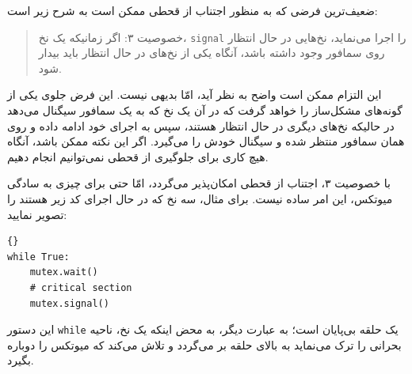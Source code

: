 \documentclass{book}
\begin{document}
    ضعیف‌ترین فرضی که به منظور اجتناب از قحطی ممکن است به شرح زیر است:

\begin{quote}
    خصوصیت ۳: اگر زمانیکه یک نخ، {\tt signal} را اجرا می‌نماید، نخ‌هایی در حال انتظار روی سمافور وجود داشته باشد،
    آنگاه یکی از نخ‌های در حال انتظار باید بیدار شود. 
\end{quote}

    این التزام ممکن است واضح به نظر آید، امّا بدیهی نیست. این فرض جلوی یکی از گونه‌های مشکل‌ساز را خواهد گرفت که در آن 
    یک نخ که به یک سمافور سیگنال می‌دهد در حالیکه نخ‌های دیگری در حال انتظار هستند، سپس به اجرای خود ادامه داده و روی همان سمافور منتظر شده و 
    سیگنال خودش را می‌گیرد. اگر این نکته ممکن باشد، آنگاه هیچ کاری برای جلوگیری از قحطی نمی‌توانیم انجام دهیم. 

    با خصوصیت ۳، اجتناب از قحطی امکان‌پذیر می‌گردد، امّا حتی برای چیزی به سادگی میوتکس، این امر ساده نیست. 
    برای مثال، سه نخ که در حال اجرای کد زیر هستند را تصویر نمایید:
    
\begin{latin}
\begin{lstlisting}[title=\rl{حلقه میوتکس}]{}
while True:
    mutex.wait()
    # critical section 
    mutex.signal()
\end{lstlisting}
\end{latin}

    این دستور {\tt while} یک حلقه بی‌پایان است؛ به عبارت دیگر، به محض اینکه یک نخ، ناحیه بحرانی را ترک می‌نماید به بالای حلقه بر می‌گردد و 
    تلاش می‌کند که میوتکس را دوباره بگیرد. 
\end{document}
